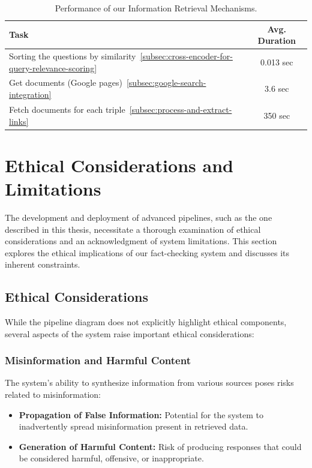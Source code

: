 \begin{table}[ht!]
    \centering
    \begin{tabular}{lc}
        \toprule
        \textbf{Task} & \textbf{Avg. Duration} \\
        \midrule
        Sorting the questions by similarity~\ref{subsec:cross-encoder-for-query-relevance-scoring} & 0.013 sec \\
        Get documents (Google pages)~\ref{subsec:google-search-integration} & 3.6 sec \\
        Fetch documents for each triple~\ref{subsec:process-and-extract-links} & 350 sec \\
        \bottomrule
    \end{tabular}
    \caption{Performance of our Information Retrieval Mechanisms.}
    \label{tab:pipeline-performance-report-2}
\end{table}



\section{Ethical Considerations and Limitations}\label{sec:ethical-considerations-and-limitations}
The development and deployment of advanced pipelines, such as the one described in this thesis, necessitate a thorough examination of ethical considerations and an acknowledgment of system limitations.
This section explores the ethical implications of our fact-checking system and discusses its inherent constraints.

\subsection{Ethical Considerations}\label{subsec:ethical-considerations}
While the pipeline diagram does not explicitly highlight ethical components, several aspects of the system raise important ethical considerations:

\subsubsection{Misinformation and Harmful Content}\label{subsubsec:misinformation-and-harmful-content}
The system's ability to synthesize information from various sources poses risks related to misinformation:
\begin{itemize}
    \item \textbf{Propagation of False Information:} Potential for the system to inadvertently spread misinformation present in retrieved data.
    \item \textbf{Generation of Harmful Content:} Risk of producing responses that could be considered harmful, offensive, or inappropriate.
\end{itemize}

